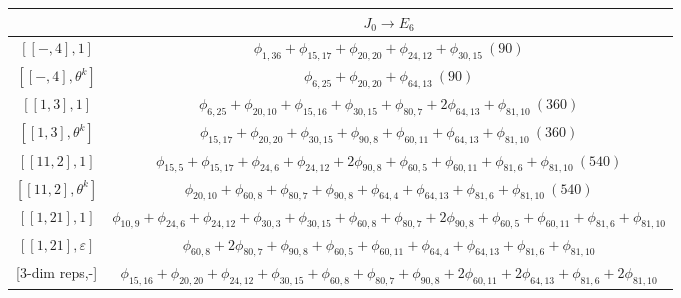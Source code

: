     \begin{table}[h!]
    \centering
    \begin{adjustbox}{max width=\linewidth}
        \begin{tabular}{|c|c|}
            \hline
            & $J_0\longrightarrow E_6$ \\\hline

            
            $[[-,4],1]$ & $\phi_{1,36}+\phi_{15,17}+\phi_{20,20}+\phi_{24,12}+\phi_{30,15}\ (90)$\\
            $[[-,4],\theta^k]$ & $\phi_{6,25}+\phi_{20,20}+\phi_{64,13}\ (90)$\\

            $[[1,3],1]$ & $\phi_{6,25}+\phi_{20,10}+\phi_{15,16}+\phi_{30,15}+\phi_{80,7}+2\phi_{64,13}+\phi_{81,10}\ (360)$ \\
            $[[1,3],\theta^k]$ & $\phi_{15,17}+\phi_{20,20}+\phi_{30,15}+\phi_{90,8}+\phi_{60,11}+\phi_{64,13}+\phi_{81,10}\ (360)$ \\

            $[[11,2],1]$ & $\phi_{15,5}+\phi_{15,17}+\phi_{24,6}+\phi_{24,12}+2\phi_{90,8}+\phi_{60,5}+\phi_{60,11}+\phi_{81,6}+\phi_{81,10}\ (540)$ \\
            $[[11,2],\theta^k]$ & $\phi_{20,10}+\phi_{60,8}+\phi_{80,7}+\phi_{90,8}+\phi_{64,4}+\phi_{64,13}+\phi_{81,6}+\phi_{81,10}\ (540)$ \\
            
            $[[1,21],1]$ & $\phi_{10,9}+\phi_{24,6}+\phi_{24,12}+\phi_{30,3}+\phi_{30,15}+\phi_{60,8}+\phi_{80,7}+2\phi_{90,8}+\phi_{60,5}+\phi_{60,11}+\phi_{81,6}+\phi_{81,10}$ \\
            $[[1,21],\varepsilon]$ & $\phi_{60,8}+2\phi_{80,7}+\phi_{90,8}+\phi_{60,5}+\phi_{60,11}+\phi_{64,4}+\phi_{64,13}+\phi_{81,6}+\phi_{81,10}$ \\
            
            [$3$-dim reps,-] & $\phi_{15,16}+\phi_{20,20}+\phi_{24,12}+\phi_{30,15}+\phi_{60,8}+\phi_{80,7}+\phi_{90,8}+2\phi_{60,11}+2\phi_{64,13}+\phi_{81,6}+2\phi_{81,10}$\\\hline

        \end{tabular}
    \end{adjustbox}
    \end{table}


